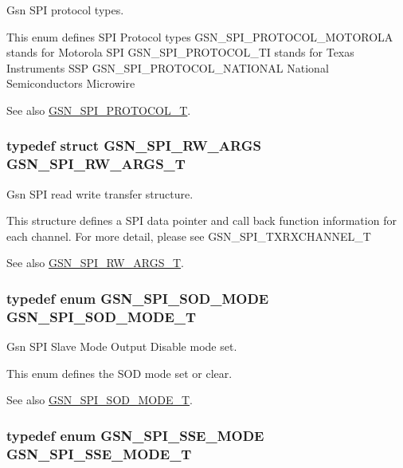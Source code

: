 Gsn SPI protocol types. 

This enum defines SPI Protocol types GSN\_\-SPI\_\-PROTOCOL\_\-MOTOROLA stands for Motorola SPI GSN\_\-SPI\_\-PROTOCOL\_\-TI stands for Texas Instruments SSP GSN\_\-SPI\_\-PROTOCOL\_\-NATIONAL National Semiconductors Microwire \begin{DoxySeeAlso}{See also}
\hyperlink{a00655_gafc404344d5f8c6a8358fa3be07a87444}{GSN\_\-SPI\_\-PROTOCOL\_\-T}. 
\end{DoxySeeAlso}
\hypertarget{a00655_ga9da696c71bee0cdc5b3365d5d055e389}{
\subsubsection[{GSN\_\-SPI\_\-RW\_\-ARGS\_\-T}]{\setlength{\rightskip}{0pt plus 5cm}typedef struct {\bf GSN\_\-SPI\_\-RW\_\-ARGS}  {\bf GSN\_\-SPI\_\-RW\_\-ARGS\_\-T}}}
\label{a00655_ga9da696c71bee0cdc5b3365d5d055e389}


Gsn SPI read write transfer structure. 

This structure defines a SPI data pointer and call back function information for each channel. For more detail, please see GSN\_\-SPI\_\-TXRXCHANNEL\_\-T

\begin{DoxySeeAlso}{See also}
\hyperlink{a00655_ga9da696c71bee0cdc5b3365d5d055e389}{GSN\_\-SPI\_\-RW\_\-ARGS\_\-T}. 
\end{DoxySeeAlso}
\hypertarget{a00655_ga5662413f1ff6b81e835e7c5412916d4b}{
\subsubsection[{GSN\_\-SPI\_\-SOD\_\-MODE\_\-T}]{\setlength{\rightskip}{0pt plus 5cm}typedef enum {\bf GSN\_\-SPI\_\-SOD\_\-MODE}  {\bf GSN\_\-SPI\_\-SOD\_\-MODE\_\-T}}}
\label{a00655_ga5662413f1ff6b81e835e7c5412916d4b}


Gsn SPI Slave Mode Output Disable mode set. 

This enum defines the SOD mode set or clear. \begin{DoxySeeAlso}{See also}
\hyperlink{a00655_ga5662413f1ff6b81e835e7c5412916d4b}{GSN\_\-SPI\_\-SOD\_\-MODE\_\-T}. 
\end{DoxySeeAlso}
\hypertarget{a00655_ga723e51f459ebae16b20d05a39ffd311a}{
\subsubsection[{GSN\_\-SPI\_\-SSE\_\-MODE\_\-T}]{\setlength{\rightskip}{0pt plus 5cm}typedef enum {\bf GSN\_\-SPI\_\-SSE\_\-MODE}  {\bf GSN\_\-SPI\_\-SSE\_\-MODE\_\-T}}}
\label{a00655_ga723e51f459ebae16b20d05a39ffd311a}


